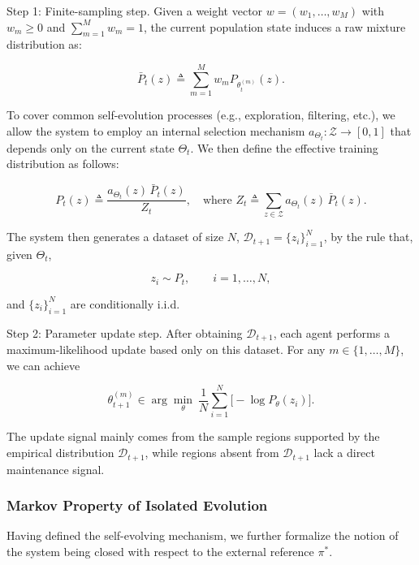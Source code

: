 \begin{definition}
Step 1: Finite-sampling step. Given a weight vector $w=(w_1,\dots,w_M)$ with $w_m\ge 0$ and $\sum_{m=1}^M w_m=1$, the current population state induces a raw mixture distribution as: 

\[
\bar P_t(z)\triangleq \sum_{m=1}^M w_m P_{\theta_t^{(m)}}(z).
\]

To cover common self-evolution processes (e.g., exploration, filtering, etc.), we allow the system to employ an internal selection mechanism $a_{\Theta_t}:\mathcal{Z}\to[0,1]$ that depends only on the current state $\Theta_t$. We then define the effective training distribution as follows: 

\[
P_t(z)\triangleq \frac{a_{\Theta_t}(z)\,\bar P_t(z)}{Z_t}, \quad \text{where } Z_t \triangleq \sum_{z\in\mathcal{Z}} a_{\Theta_t}(z)\,\bar P_t(z).
\]

The system then generates a dataset of size $N$, $\mathcal{D}_{t+1} = \{z_i\}_{i=1}^N$, by the rule that, given $\Theta_t$,


\[
z_i\sim P_t,\qquad i=1,\dots,N,
\]

and $\{z_i\}_{i=1}^N$ are conditionally i.i.d.

Step 2: Parameter update step. 
After obtaining $\mathcal{D}_{t+1}$, each agent performs a maximum-likelihood update based only on this dataset. For any $m\in\{1,\dots,M\}$, we can achieve

\[
\theta_{t+1}^{(m)}\in\arg\min_{\theta}\ \frac{1}{N}\sum_{i=1}^{N}\bigl[-\log P_{\theta}(z_i)\bigr].
\]

The update signal mainly comes from the sample regions supported by the empirical distribution $\mathcal{D}_{t+1}$, while regions absent from $\mathcal{D}_{t+1}$ lack a direct maintenance signal.

\end{definition}

\subsubsection{Markov Property of Isolated Evolution}\label{sec:2-4-2-markov-isolation}

Having defined the self-evolving mechanism, we further formalize the notion of the system being closed with respect to the external reference $\pi^\ast$.


